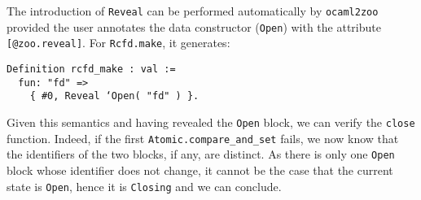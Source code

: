 The introduction of \texttt{Reveal} can be performed automatically by \texttt{ocaml2zoo} provided the user annotates the data constructor (\eg \texttt{Open}) with the attribute \texttt{[@zoo.reveal]}.
For \texttt{Rcfd.make}, it generates:

\begin{verbatim}
Definition rcfd_make : val :=
  fun: "fd" =>
    { #0, Reveal ‘Open( "fd" ) }.
\end{verbatim}

Given this semantics and having revealed the \texttt{Open} block, we can verify the \texttt{close} function.
Indeed, if the first \texttt{Atomic.compare_and_set} fails, we now know that the identifiers of the two blocks, if any, are distinct.
As there is only one \texttt{Open} block whose identifier does not change, it cannot be the case that the current state is \texttt{Open}, hence it is \texttt{Closing} and we can conclude.